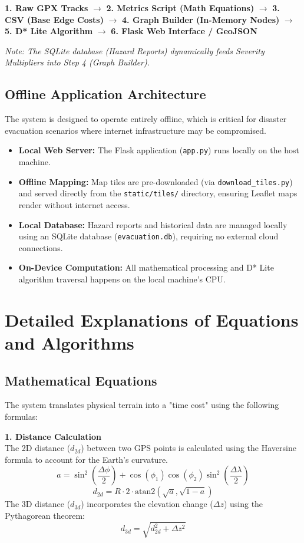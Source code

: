 \documentclass[12pt, a4paper]{article}
\begin{document}
\vspace{1em}
\textbf{1. Raw GPX Tracks} $\rightarrow$ \textbf{2. Metrics Script (Math Equations)} $\rightarrow$ \textbf{3. CSV (Base Edge Costs)} $\rightarrow$ \textbf{4. Graph Builder (In-Memory Nodes)} $\rightarrow$ \textbf{5. D* Lite Algorithm} $\rightarrow$ \textbf{6. Flask Web Interface / GeoJSON}

\textit{Note: The SQLite database (Hazard Reports) dynamically feeds Severity Multipliers into Step 4 (Graph Builder).}

\subsection{Offline Application Architecture}
The system is designed to operate entirely offline, which is critical for disaster evacuation scenarios where internet infrastructure may be compromised.
\begin{itemize}
    \item \textbf{Local Web Server:} The Flask application (\texttt{app.py}) runs locally on the host machine.
    \item \textbf{Offline Mapping:} Map tiles are pre-downloaded (via \texttt{download\_tiles.py}) and served directly from the \texttt{static/tiles/} directory, ensuring Leaflet maps render without internet access.
    \item \textbf{Local Database:} Hazard reports and historical data are managed locally using an SQLite database (\texttt{evacuation.db}), requiring no external cloud connections.
    \item \textbf{On-Device Computation:} All mathematical processing and D* Lite algorithm traversal happens on the local machine's CPU.
\end{itemize}

\newpage
\section{Detailed Explanations of Equations and Algorithms}

\subsection{Mathematical Equations}
The system translates physical terrain into a "time cost" using the following formulas:

\textbf{1. Distance Calculation} \\
The 2D distance ($d_{2d}$) between two GPS points is calculated using the Haversine formula to account for the Earth's curvature.
\begin{equation}
    a = \sin^2\left(\frac{\Delta\phi}{2}\right) + \cos(\phi_1)\cos(\phi_2)\sin^2\left(\frac{\Delta\lambda}{2}\right)
\end{equation}
\begin{equation}
    d_{2d} = R \cdot 2 \cdot \text{atan2}\left(\sqrt{a}, \sqrt{1-a}\right)
\end{equation}
The 3D distance ($d_{3d}$) incorporates the elevation change ($\Delta z$) using the Pythagorean theorem:
\begin{equation}
    d_{3d} = \sqrt{d_{2d}^2 + \Delta z^2}
\end{equation}
\end{document}
